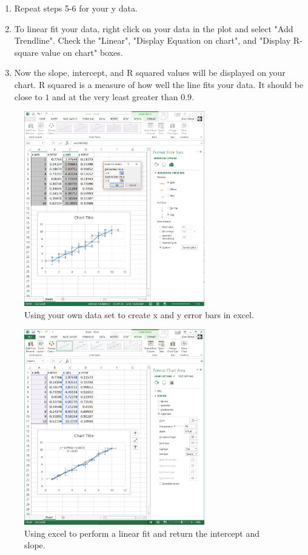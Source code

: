 \begin{enumerate}
\item Repeat steps 5-6 for your y data.
\item To linear fit your data, right click on your data in the plot and select "Add Trendline". Check the "Linear", "Display Equation on chart", and "Display R-square value on chart" boxes.
\item Now the slope, intercept, and R squared values will be displayed on your chart. R squared is a measure of how well the line fits your data. It should be close to $1$ and at the very least greater than $0.9$.
\end{enumerate}

\begin{figure}[h!]
\centering
\includegraphics[height=0.4\textheight, width=0.7\textwidth]{./Exp1/pic/image5.png}
\caption{Using your own data set to create x and y error bars in excel.}
\label{fig:excel2}
\end{figure}

\begin{figure}[h!]
\centering
\includegraphics[height=0.4\textheight, width = 0.7\textwidth]{./Exp1/pic/image6.png}
\caption{Using excel to perform a linear fit and return the intercept and slope.}
\label{fig:excel3}
\end{figure}

